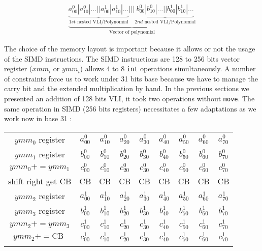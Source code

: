 \documentclass[11pt]{amsart}
\begin{document}
\begin{eqnarray}
 \underbrace{
 \underbrace{a^0_{00} | a^0_{10} | \dots || a^1_{00} | a^1_{10} | \dots  }_{1st  \textrm{ nested VLI/Polynomial} } |||  \underbrace{b^0_{00} | b^0_{10} | \dots || b^1_{00} | b^1_{10} | \dots  }_{2nd  \textrm{ nested VLI/Polynomial} }
 }_{\textrm{Vector of polynomial}} \nonumber
\end{eqnarray}

The choice of the memory layout is important because it allows or not the usage of the SIMD instructions. The SIMD instructions are 128 to 256 bits vector register ($xmm_i$ or $ymm_i$) allows 4 to 8 \texttt{int}  operations simultaneously.
A number of constraints force us to work under 31 bits base because we have to manage the carry bit and the extended multiplication by hand. In the previous sections we presented an addition of 128 bits VLI, it took two operations
without \texttt{move}.   The same operation in SIMD (256 bits registers) necessitates a few adaptations as we work now in base 31 :    

\begin{center}
\begin{tabular}{ c  c c c c c c c c} 
\\
 $ymm_0$   register      &    $a^0_{00}$  & $a^0_{10}$ & $a^0_{20}$  &  $a^0_{30}$ & $a^0_{40}$  &   $a^0_{50}$ &  $a^0_{60}$   & $a^0_{70}$  \\
 $ymm_1$   register      &    $b^0_{00}$  & $b^0_{10}$ & $b^0_{20}$  &  $b^0_{30}$ & $b^0_{40}$  &   $b^0_{50}$ &  $b^0_{60}$   & $b^0_{70}$  \\
$ymm_0 += ymm_1$    &    $c^0_{00}$  & $c^0_{10}$ & $c^0_{20}$  &  $c^0_{30}$  & $c^0_{40}$  &   $c^0_{50}$  &  $c^0_{60}$   & $c^0_{70}$  \\
shift right  get CB        &     CB                 & CB                & CB                 & CB                   & CB               &  CB                   & CB                   & CB \\
$ymm_2$   register      &    $a^1_{00}$  & $a^1_{10}$ & $a^1_{20}$  &  $a^1_{30}$ & $a^1_{40}$  &   $a^1_{50}$ &  $a^1_{60}$   & $a^1_{70}$  \\
 $ymm_3$   register      &    $b^1_{00}$  & $b^1_{10}$ & $b^1_{20}$  &  $b^1_{30}$ & $b^1_{40}$  &   $b^1_{50}$ &  $b^1_{60}$   & $b^1_{70}$  \\
$ymm_2 += ymm_3$     & $c^1_{00}$  & $c^1_{10}$ & $c^1_{20}$  &  $c^1_{30}$  & $c^1_{40}$  &   $c^1_{50}$  &  $c^1_{60}$   & $c^1_{70}$  \\                            
$ymm_2 +=  \textrm{CB } $ & $c^1_{00}$  & $c^1_{10}$ & $c^1_{20}$  &  $c^1_{30}$  & $c^1_{40}$  &   $c^1_{50}$  &  $c^1_{60}$   & $c^1_{70}$  \\                            
\\
\end{tabular}
\end{center}
\end{document}
